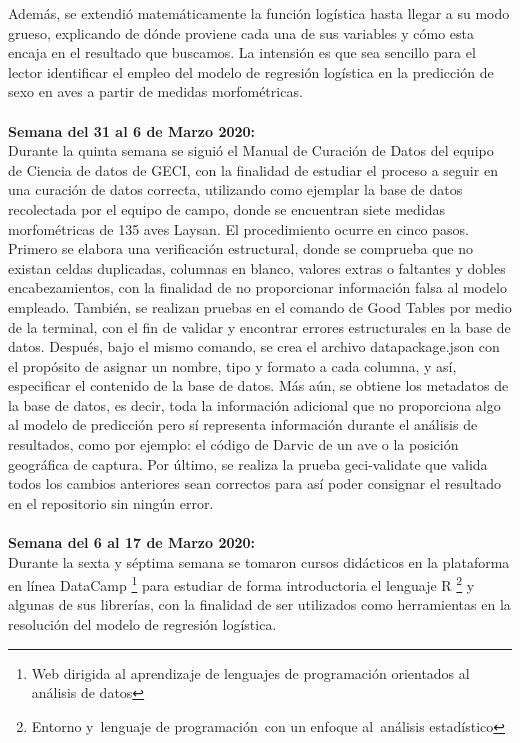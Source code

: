 \documentclass{article}
\begin{document}
    Además, se extendió matemáticamente la función logística hasta llegar a su modo grueso, explicando de dónde proviene cada una de sus variables y cómo esta encaja en el resultado que buscamos. La intensión es que sea sencillo para el lector identificar el empleo del modelo de regresión logística en la predicción de sexo en aves a partir de medidas morfométricas. 
    \\ \\
    \textbf{Semana del 31 al 6 de Marzo 2020:} \\
    Durante la quinta semana se siguió el Manual de Curación de Datos del equipo de Ciencia de datos de GECI, con la finalidad de estudiar el proceso a seguir en una curación de datos correcta, utilizando como ejemplar la base de datos recolectada por el equipo de campo, donde se encuentran siete medidas morfométricas de 135 aves Laysan.
    El procedimiento ocurre en cinco pasos. Primero se elabora una verificación estructural, donde se comprueba que no existan celdas duplicadas, columnas en blanco, valores extras o faltantes y dobles encabezamientos, con la finalidad de no proporcionar información falsa al modelo empleado. También, se realizan pruebas en el comando de Good Tables por medio de la terminal, con el fin de validar y encontrar errores estructurales en la base de datos.
    Después, bajo el mismo comando, se crea el archivo datapackage.json con el propósito de asignar un nombre, tipo y formato a cada columna, y así, especificar el contenido de la base de datos. Más aún, se obtiene los metadatos de la base de datos, es decir, toda la información adicional que no proporciona algo al modelo de predicción pero sí representa información durante el análisis de resultados, como por ejemplo: el código de Darvic de un ave o la posición geográfica de captura.
    Por último, se realiza la prueba geci-validate que valida todos los cambios anteriores sean correctos para así poder consignar el resultado en el repositorio sin ningún error. 
    \\ \\
    \textbf{Semana del 6 al 17 de Marzo 2020:} \\
    Durante la sexta y séptima semana se tomaron cursos didácticos en la plataforma en línea DataCamp \footnote{Web dirigida al aprendizaje de lenguajes de programación orientados al análisis de datos} para estudiar de forma introductoria el lenguaje R \footnote{Entorno y lenguaje de programación con un enfoque al análisis estadístico} y algunas de sus librerías, con la finalidad de ser utilizados como herramientas en la resolución del modelo de regresión logística.
\end{document}
